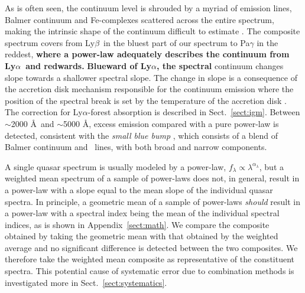 \documentclass{aa}    %
\newcommand{\figlabel}[1]{\label{fig:#1}}
\newcommand{\sectionname}{Sect.}
\newcommand{\Sect}[1]{\sectionname~\ref{sect:#1}}
\newcommand{\sect}[1]{\Sect{#1}}
\newcommand{\App}[1]{Appendix~\ref{sect:#1}}
\newcommand{\lya}{Ly$\alpha$}
\newcommand{\lyb}{Ly$\beta$}
\newcommand{\feii}{\ion{Fe}{ii}}
\begin{document}


As is often seen, the continuum level is shrouded by a myriad of emission lines,
Balmer continuum and Fe-complexes scattered across the entire spectrum, making
the intrinsic shape of the continuum difficult to estimate \citep{Elvis2001}. 
The composite spectrum covers from \lyb ~in the bluest part of our spectrum to
Pa$\gamma$ in the reddest, \textbf{where a power-law adequately describes the
continuum from \lya~and redwards.} \textbf{Blueward of \lya, the spectral}
continuum changes slope towards a shallower spectral slope. The change in slope
is a consequence of the accretion disk mechanism responsible for the continuum
emission where the position of the spectral break is set by the temperature of the
accretion disk \citep{Pereyra2006}. The correction for \lya-forest absorption is
described in \sect{igm}.
Between $\sim$2000 \AA~and $\sim$5000 \AA, excess emission compared with a
pure power-law is detected, consistent with the \textit{small blue bump}
\citep{Wills1985}, which consists of a blend of Balmer continuum and \feii
~lines, with both broad and narrow components.

 A single quasar spectrum is usually modeled by a power-law, $f_{\lambda}
\propto \lambda^{\alpha_{\lambda}}$, but a weighted mean spectrum of a sample of power-laws
does not, in general, result in a power-law with a slope equal to the mean slope of
the individual quasar spectra. In principle, a geometric mean of a sample of power-laws
\textit{should} result in a power-law with a spectral index being the mean of the individual spectral indices, as is shown in
\App{math}. We compare the composite obtained by taking the geometric mean with
that obtained by the weighted average and no significant difference is detected
between the two composites. We therefore take the weighted mean composite as
representative of the constituent spectra. This potential cause of systematic
error due to combination methods is investigated more in \sect{systematics}.
\end{document}
